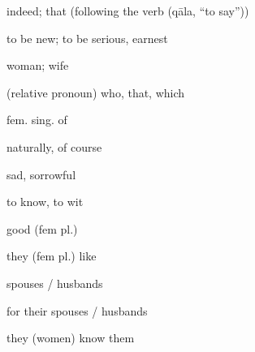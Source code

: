 \documentclass[avery5371,grid,frame]{flashcards}
\begin{document}
\begin{flashcard}{\LARGE indeed; that (following the verb  (qāla, “to say”))}
\LARGE {}
\end{flashcard}
\begin{flashcard}{\LARGE to be new; to be serious, earnest}
\LARGE {}
\end{flashcard}
\begin{flashcard}{\LARGE woman; wife}
\LARGE {}
\end{flashcard}
\begin{flashcard}{\LARGE (relative pronoun) who, that, which}
\LARGE {}
\end{flashcard}
\begin{flashcard}{\LARGE fem. sing. of }
\LARGE {}
\end{flashcard}
\begin{flashcard}{\LARGE naturally, of course}
\LARGE {}
\end{flashcard}
\begin{flashcard}{\LARGE sad, sorrowful}
\LARGE {}
\end{flashcard}
\begin{flashcard}{\LARGE to know, to wit}
\LARGE {}
\end{flashcard}
\begin{flashcard}{\LARGE good (fem pl.)}
\LARGE {}
\end{flashcard}
\begin{flashcard}{\LARGE they (fem pl.) like}
\LARGE {}
\end{flashcard}
\begin{flashcard}{\LARGE spouses / husbands}
\LARGE {}
\end{flashcard}
\begin{flashcard}{\LARGE for their spouses / husbands}
\LARGE {}
\end{flashcard}
\begin{flashcard}{\LARGE they (women) know them}
\LARGE {}
\end{flashcard}
\end{document}
